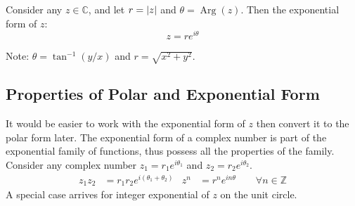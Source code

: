 \documentclass[12pt, english]{book}
\DeclareMathOperator\Arg{Arg}
\begin{document}
	\begin{definition}
	Consider any $z \in \mathbb{C}$, and let $r = \abs{z}$ and $\theta = \Arg(z)$. Then the exponential form of $z$:
		$$z = r e^{i \theta}$$
		\label{Exponential Form of z - Complex}
	\end{definition}
	Note: $\theta = \tan^{-1}(y/x)$ and $r = \sqrt{x^2 + y^2}$.
	\begin{center}
	\end{center}
	
	\subsection{Properties of Polar and Exponential Form} \label{Properties of Polar and Exponential Form Subsection - Complex}
	It would be easier to work with the exponential form of $z$ then convert it to the polar form later. The exponential form of a complex number is part of the exponential family of functions, thus possess all the properties of the family. Consider any complex number $z_1 = r_1 e^{i\theta_1}$ and $z_2 = r_2 e^{i\theta_2}$.
	\begin{align*}
		z_1  z_2 &= r_1 r_2 e^{i(\theta_1 + \theta_2)} 
			& z^n &= r^n e^{i n \theta} \qquad \forall n \in \mathbb{Z}
	\end{align*}
	A special case arrives for integer exponential of $z$ on the unit circle.
	
\end{document}
